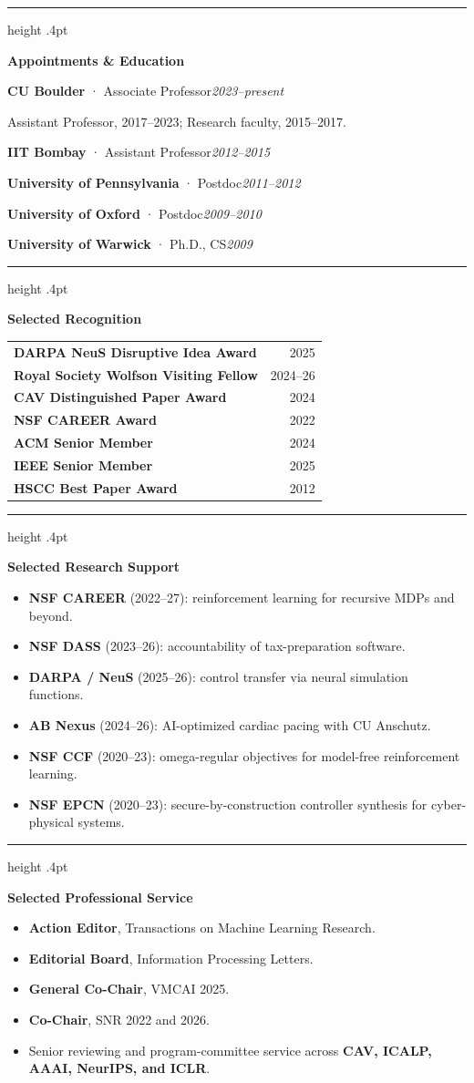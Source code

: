 \documentclass[10pt,letterpaper]{article}
\newcommand{\cvsection}[1]{%
  \par\vspace{7bp}\hrule height .4pt\vspace{5.2bp}%
  {\fontsize{11.5}{13.2}\selectfont\bfseries #1\par}\vspace{3bp}}
\newcommand{\cvrow}[2]{\noindent #1\hfill\textit{#2}\par}
\begin{document}
\noindent\begin{minipage}[t]{0.445\textwidth}
\vspace{0pt}

\cvsection{Appointments \& Education}
\cvrow{\textbf{CU Boulder} · Associate Professor}{2023--present}
{\fontsize{9.0}{10.7}\selectfont Assistant Professor, 2017--2023; Research faculty, 2015--2017.\par}
\cvrow{\textbf{IIT Bombay} · Assistant Professor}{2012--2015}
\cvrow{\textbf{University of Pennsylvania} · Postdoc}{2011--2012}
\cvrow{\textbf{University of Oxford} · Postdoc}{2009--2010}
\cvrow{\textbf{University of Warwick} · Ph.D., CS}{2009}

\cvsection{Selected Recognition}
\begin{tabularx}{\linewidth}{@{}X r@{}}
\textbf{DARPA NeuS Disruptive Idea Award} & 2025\\
\textbf{Royal Society Wolfson Visiting Fellow} & 2024--26\\
\textbf{CAV Distinguished Paper Award} & 2024\\
\textbf{NSF CAREER Award} & 2022\\
\textbf{ACM Senior Member} & 2024\\
\textbf{IEEE Senior Member} & 2025\\
\textbf{HSCC Best Paper Award} & 2012\\
\end{tabularx}

\cvsection{Selected Research Support}
\begin{itemize}
  \item \textbf{NSF CAREER} (2022--27): reinforcement learning for recursive MDPs and beyond.
  \item \textbf{NSF DASS} (2023--26): accountability of tax-preparation software.
  \item \textbf{DARPA / NeuS} (2025--26): control transfer via neural simulation functions.
  \item \textbf{AB Nexus} (2024--26): AI-optimized cardiac pacing with CU Anschutz.
  \item \textbf{NSF CCF} (2020--23): omega-regular objectives for model-free reinforcement learning.
  \item \textbf{NSF EPCN} (2020--23): secure-by-construction controller synthesis for cyber-physical systems.
\end{itemize}

\cvsection{Selected Professional Service}
\begin{itemize}
  \item \textbf{Action Editor}, Transactions on Machine Learning Research.
  \item \textbf{Editorial Board}, Information Processing Letters.
  \item \textbf{General Co-Chair}, VMCAI 2025.
  \item \textbf{Co-Chair}, SNR 2022 and 2026.
  \item Senior reviewing and program-committee service across \textbf{CAV, ICALP, AAAI, NeurIPS, and ICLR}.
\end{itemize}

\end{minipage}\hfill
\end{document}
